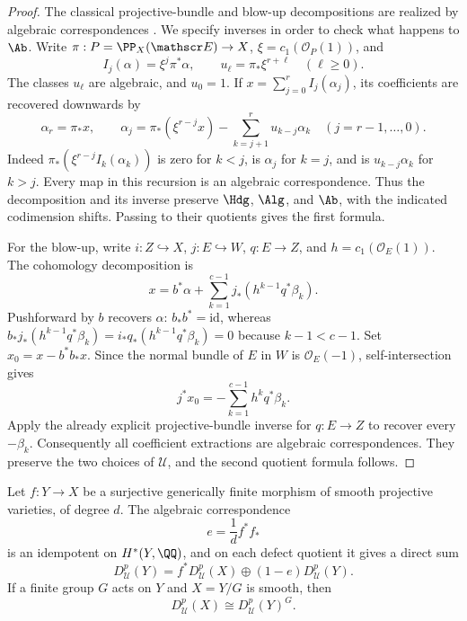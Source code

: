 \begin{proof}
The classical projective-bundle and blow-up decompositions are
realized by algebraic correspondences \cite[\S\S7,9]{Man68}.
We specify inverses in order to check what happens to \(\Ab\).
Write \(\pi:P=\PP_X(\mathscr E)\to X\),
\(\xi=c_1(\mathcal O_P(1))\), and
\[
 I_j(\alpha)=\xi^j\pi^*\alpha,
 \qquad u_\ell=\pi_*\xi^{r+\ell}\quad(\ell\ge0).
\]
The classes \(u_\ell\) are algebraic, and \(u_0=1\).
If \(x=\sum_{j=0}^r I_j(\alpha_j)\), its coefficients are
recovered downwards by
\[
 \alpha_r=\pi_*x,\qquad
 \alpha_j=\pi_*(\xi^{r-j}x)
             -\sum_{k=j+1}^r u_{k-j}\alpha_k
       \quad(j=r-1,\ldots,0).
\]
Indeed \(\pi_*(\xi^{r-j}I_k(\alpha_k))\) is zero for
\(k<j\), is \(\alpha_j\) for \(k=j\), and is
\(u_{k-j}\alpha_k\) for \(k>j\). Every map in this recursion
is an algebraic correspondence. Thus the decomposition and its
inverse preserve \(\Hdg\), \(\Alg\), and \(\Ab\), with the
indicated codimension shifts. Passing to their quotients gives
the first formula.

For the blow-up, write \(i:Z\hookrightarrow X\),
\(j:E\hookrightarrow W\), \(q:E\to Z\), and
\(h=c_1(\mathcal O_E(1))\). The cohomology decomposition is
\[
 x=b^*\alpha+
       \sum_{k=1}^{c-1}j_*(h^{k-1}q^*\beta_k).
\]
Pushforward by \(b\) recovers \(\alpha\):
\(b_*b^*=\mathrm{id}\), whereas
\(b_*j_*(h^{k-1}q^*\beta_k)=i_*q_*(h^{k-1}q^*\beta_k)=0\)
because \(k-1<c-1\). Set \(x_0=x-b^*b_*x\). Since the
normal bundle of \(E\) in \(W\) is \(\mathcal O_E(-1)\),
self-intersection gives
\[
 j^*x_0=-\sum_{k=1}^{c-1}h^kq^*\beta_k.
\]
Apply the already explicit projective-bundle inverse for
\(q:E\to Z\) to recover every \(-\beta_k\).
Consequently all coefficient extractions are algebraic
correspondences. They preserve the two choices of
\(\mathcal U\), and the second quotient formula follows.
\end{proof}

\begin{proposition}
\label{v7:prop:trace-defect-splitting}
Let \(f:Y\to X\) be a surjective generically finite morphism
of smooth projective varieties, of degree \(d\). The algebraic
correspondence
\[
 e=\frac1d f^*f_*
\]
is an idempotent on \(H^*(Y,\QQ)\), and on each defect quotient
it gives a direct sum
\[
 D_{\mathcal U}^p(Y)
    =f^*D_{\mathcal U}^p(X)
        \oplus(1-e)D_{\mathcal U}^p(Y).
\]
If a finite group \(G\) acts on \(Y\) and \(X=Y/G\) is
smooth, then
\[
 D_{\mathcal U}^p(X)
      \cong D_{\mathcal U}^p(Y)^G.
\]
\end{proposition}

